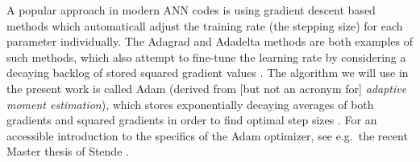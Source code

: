 \documentclass[../../master.tex]{subfiles}
\begin{document}
A popular approach in modern ANN codes is using gradient descent based methods which automaticall adjust the training rate (the stepping size) for each parameter individually. The Adagrad and Adadelta methods are both examples of such methods, which also attempt to fine-tune the learning rate by considering a decaying backlog of stored squared gradient values \cite{opti}. The algorithm we will use in the present work is called Adam (derived from [but not an acronym for] \emph{adaptive moment estimation}), which stores exponentially decaying averages of both gradients and squared gradients in order to find optimal step sizes \cite{adam}. For an accessible introduction to the specifics of the Adam optimizer, see e.g.\ the recent Master thesis of Stende \cite{stende}.
\end{document}
